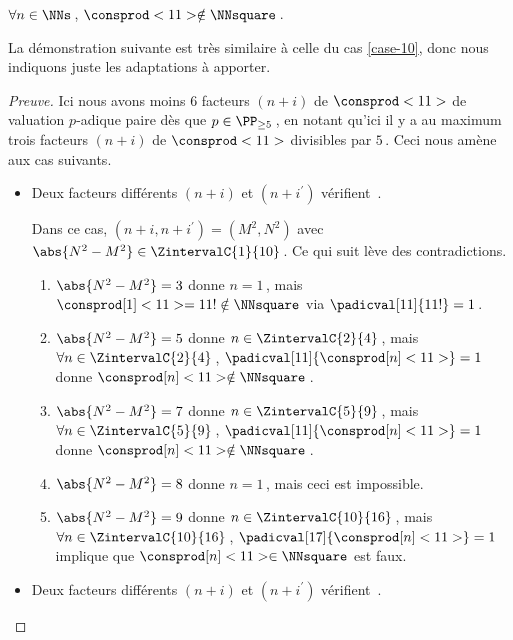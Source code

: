 \begin{fact} \label{case-11}
	 $\forall n \in \NNs$\,, $\consprod<11> \notin \NNsquare$\,.
\end{fact}




La démonstration suivante est très similaire à celle du cas \ref{case-10}, donc nous indiquons juste les adaptations à apporter.


\begin{proof}[Preuve]%
    Ici nous avons moins $6$ facteurs $(n + i)$ de $\consprod<11>$ de valuation $p$-adique paire dès que $p \in \PP_{\geq 5}$\,, en notant qu'ici il y a au maximum trois facteurs $(n + i)$ de $\consprod<11>$ divisibles par $5$\,. Ceci nous amène aux cas suivants.
    \begin{itemize}
    	\medskip
		\item Deux facteurs différents $(n+i)$ et $(n+i^\prime)$ vérifient \,.
		
		\smallskip
		\noindent
		Dans ce cas, $(n+i, n+i^\prime) = (M^2, N^2)$ avec $\abs{N^2 - M^2} \in \ZintervalC{1}{10}$\,. Ce qui suit lève des contradictions.
		\begin{enumerate}
			\item $\abs{N^2 - M^2} = 3$ donne $n = 1$\,, mais $\consprod[1]<11> = 11 ! \notin \NNsquare$ via $\padicval[11]{11!} = 1$\,.


			\item $\abs{N^2 - M^2} = 5$ donne $n \in \ZintervalC{2}{4}$\,, mais $\forall n \in \ZintervalC{2}{4}$\,, $\padicval[11]{\consprod[n]<11>} = 1$ donne $\consprod[n]<11> \notin \NNsquare$\,.
			

			\item $\abs{N^2 - M^2} = 7$ donne $n \in \ZintervalC{5}{9}$\,, mais $\forall n \in \ZintervalC{5}{9}$\,, $\padicval[11]{\consprod[n]<11>} = 1$ donne $\consprod[n]<11> \notin \NNsquare$\,.


			\item $\abs{N^2 - M^2} = 8$ donne $n = 1$\,, mais ceci est impossible.

			\item $\abs{N^2 - M^2} = 9$ donne $n \in \ZintervalC{10}{16}$\,, mais $\forall n \in \ZintervalC{10}{16}$\,, $\padicval[17]{\consprod[n]<11>} = 1$ implique que $\consprod[n]<11> \in \NNsquare$ est faux.
		\end{enumerate}


    	\medskip
		\item Deux facteurs différents $(n+i)$ et $(n+i^\prime)$ vérifient \,.
		

\end{itemize}
\end{proof}
